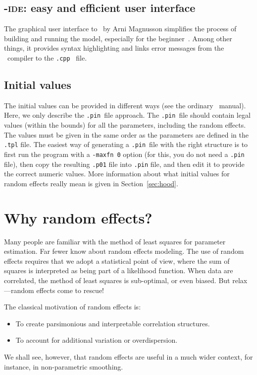 \documentclass{admbmanual}
\begin{document}
\subsection{\scAB-\textsc{ide}: easy and efficient user interface}

The graphical user interface to \scAB\ by Arni Magnusson simplifies the process
of building and running the model, especially for the
beginner~\cite{admb_news_july09}. Among other things, it provides syntax
highlighting and links error messages from the \cplus\ compiler to the
\texttt{.cpp}~ file.

\subsection{Initial values}

The initial values can be provided in different ways (see the ordinary \scAB\
manual). Here, we only describe the \texttt{.pin}~file approach. The
\texttt{.pin}~file should contain legal values (within the bounds) for all the
parameters, including the random effects. The values must be given in the same
order as the parameters are defined in the \texttt{.tpl} file. The easiest way
of generating a \texttt{.pin}~file with the right structure is to first run the
program with a \texttt{-maxfn 0} option (for this, you do not need a
\texttt{.pin} file), then copy the resulting \texttt{.p01} file into
\texttt{.pin} file, and then edit it to provide the correct numeric values. More
information about what initial values for random effects really mean is given in
Section~\ref{sec:hood}.

\section{Why random effects?}

Many people are familiar with the method of least squares for parameter
estimation. Far fewer know about random effects modeling. The use of random
effects requires that we adopt a statistical point of view, where the sum of
squares is interpreted as being part of a likelihood function. When data are
correlated, the method of least squares is sub-optimal, or even biased. But
relax---random effects come to rescue! \index{random effects}

The classical motivation of random effects is:
\begin{itemize}
  \item To create parsimonious and interpretable correlation structures.

  \item To account for additional variation or overdispersion.
\end{itemize}
We shall see, however, that random effects are useful in a much wider context,
for instance, in non-parametric smoothing. %
\end{document}

